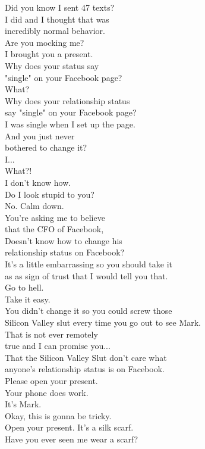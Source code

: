 \documentclass{article}
\begin{document}
\begin{multicols}{3}
Did you know I sent 47 texts?\\
I did and I thought that was\\
incredibly normal behavior.\\
Are you mocking me?\\
I brought you a present.\\
Why does your status say\\
"single" on your Facebook page?\\
What?\\
Why does your relationship status\\
say "single" on your Facebook page?\\
I was single when I set up the page.\\
And you just never\\
bothered to change it?\\
I...\\
What?!\\
I don't know how.\\
Do I look stupid to you?\\
No. Calm down.\\
You're asking me to believe\\
that the CFO of Facebook,\\
Doesn't know how to change his\\
relationship status on Facebook?\\
It's a little embarrassing so you should take it\\
as as sign of trust that I would tell you that.\\
Go to hell.\\
Take it easy.\\
You didn't change it so you could screw those\\
Silicon Valley slut every time you go out to see Mark.\\
That is not ever remotely\\
true and I can promise you...\\
That the Silicon Valley Slut don't care what\\
anyone's relationship status is on Facebook.\\
Please open your present.\\
Your phone does work.\\
It's Mark.\\
Okay, this is gonna be tricky.\\
Open your present. It's a silk scarf.\\
Have you ever seen me wear a scarf?\\

\end{multicols}
\end{document}
